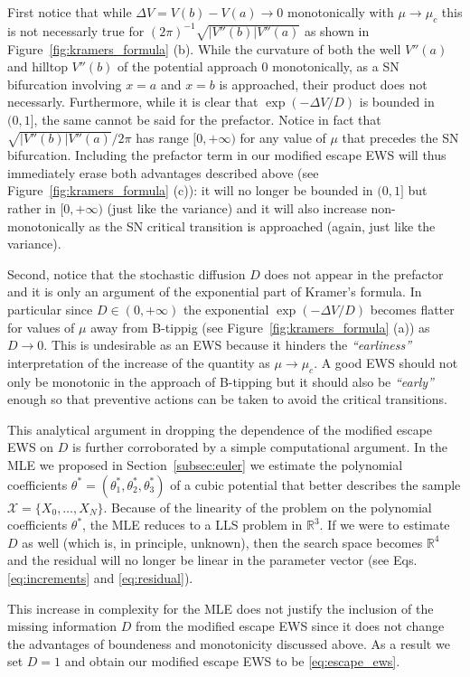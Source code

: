 \documentclass[a4paper,fleqn]{cas-sc}
\newcommand{\sref}[1]{Section~\ref{#1}}
\newcommand{\fref}[1]{Figure~\ref{#1}}
\begin{document}
First notice that while $\Delta V = V(b) - V(a)\to0$ monotonically with $\mu\to\mu_c$ this is not necessarly true for $(2\pi)^{-1}\sqrt{|V''(b)|V''(a)}$ as shown in \fref{fig:kramers_formula} (b).
While the curvature of both the well $V''(a)$ and hilltop $V''(b)$ of the potential approach $0$ monotonically, as a SN bifurcation involving $x=a$ and $x=b$ is approached, their product does not necessarly.
Furthermore, while it is clear that $\exp(-\Delta V/D)$ is bounded in $(0,1]$, the same cannot be said for the prefactor.
Notice in fact that $\sqrt{|V''(b)|V''(a)}/2\pi$ has range $[0,+\infty)$ for any value of $\mu$ that precedes the SN bifurcation.
Including the prefactor term in our modified escape EWS will thus immediately erase both advantages described above (see \fref{fig:kramers_formula} (c)): it will no longer be bounded in $(0,1]$ but rather in $[0,+\infty)$ (just like the variance) and it will also increase non-monotonically as the SN critical transition is approached (again, just like the variance).

Second, notice that the stochastic diffusion $D$ does not appear in the prefactor and it is only an argument of the exponential part of Kramer's formula.
In particular since $D\in(0,+\infty)$ the exponential $\exp(-\Delta V/D)$ becomes flatter for values of $\mu$ away from B-tippig (see \fref{fig:kramers_formula} (a)) as $D\to0$.
This is undesirable as an EWS because it hinders the \textit{``earliness''} interpretation of the increase of the quantity as $\mu\to\mu_c$.
A good EWS should not only be monotonic in the approach of B-tipping but it should also be \textit{``early''} enough so that preventive actions can be taken to avoid the critical transitions.

This analytical argument in dropping the dependence of the modified escape EWS on $D$ is further corroborated by a simple computational argument.
In the MLE we proposed in \sref{subsec:euler} we estimate the polynomial coefficients $\theta^* = (\theta_1^*,\theta_2^*,\theta_3^*)$ of a cubic potential that better describes the sample $\mathcal{X}=\{X_0,\dots,X_N\}$.
Because of the linearity of the problem on the polynomial coefficients $\theta^*$, the MLE reduces to a LLS problem in $\mathbb{R}^{3}$.
If we were to estimate $D$ as well (which is, in principle, unknown), then the search space becomes $\mathbb{R}^{4}$ and the residual will no longer be linear in the parameter vector (see Eqs. \eqref{eq:increments} and \eqref{eq:residual}).

This increase in complexity for the MLE does not justify the inclusion of the missing information $D$ from the modified escape EWS since it does not change the advantages of boundeness and monotonicity discussed above.
As a result we set $D=1$ and obtain our modified escape EWS to be \eqref{eq:escape_ews}.
%
\end{document}
